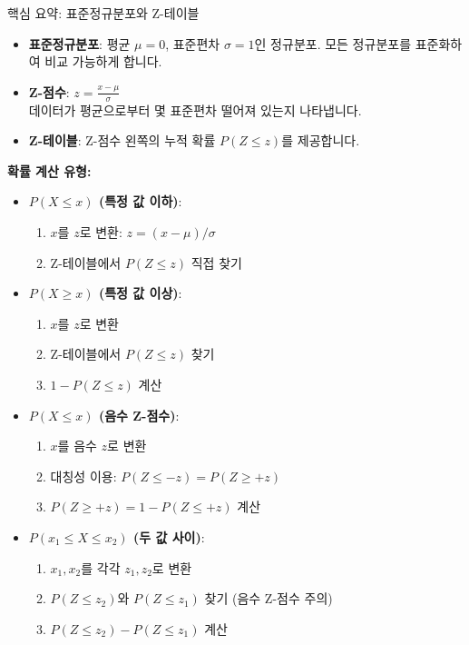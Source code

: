 \documentclass[11pt,a4paper]{article}
\begin{document}
\begin{summarybox}{핵심 요약: 표준정규분포와 Z-테이블}
\begin{itemize}
    \item \textbf{표준정규분포}: 평균 $\mu=0$, 표준편차 $\sigma=1$인 정규분포. 모든 정규분포를 표준화하여 비교 가능하게 합니다.
    \item \textbf{Z-점수}: $z = \frac{x - \mu}{\sigma}$ \\
    데이터가 평균으로부터 몇 표준편차 떨어져 있는지 나타냅니다.
    \item \textbf{Z-테이블}: Z-점수 왼쪽의 누적 확률 $P(Z \le z)$를 제공합니다.
\end{itemize}

\textbf{확률 계산 유형:}
\begin{itemize}
    \item \textbf{$P(X \le x)$ (특정 값 이하)}:
        \begin{enumerate}
            \item $x$를 $z$로 변환: $z = (x - \mu) / \sigma$
            \item Z-테이블에서 $P(Z \le z)$ 직접 찾기
        \end{enumerate}
    \item \textbf{$P(X \ge x)$ (특정 값 이상)}:
        \begin{enumerate}
            \item $x$를 $z$로 변환
            \item Z-테이블에서 $P(Z \le z)$ 찾기
            \item $1 - P(Z \le z)$ 계산
        \end{enumerate}
    \item \textbf{$P(X \le x)$ (음수 Z-점수)}:
        \begin{enumerate}
            \item $x$를 음수 $z$로 변환
            \item 대칭성 이용: $P(Z \le -z) = P(Z \ge +z)$
            \item $P(Z \ge +z) = 1 - P(Z \le +z)$ 계산
        \end{enumerate}
    \item \textbf{$P(x_1 \le X \le x_2)$ (두 값 사이)}:
        \begin{enumerate}
            \item $x_1, x_2$를 각각 $z_1, z_2$로 변환
            \item $P(Z \le z_2)$와 $P(Z \le z_1)$ 찾기 (음수 Z-점수 주의)
            \item $P(Z \le z_2) - P(Z \le z_1)$ 계산
        \end{enumerate}
\end{itemize}


\end{summarybox}
\end{document}

